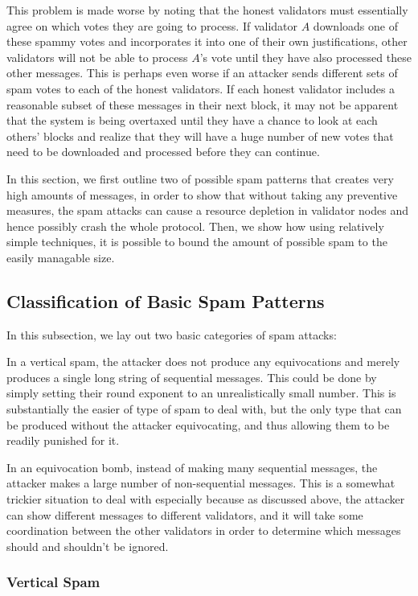 \documentclass[12pt, fleqn]{article}
\begin{document}
This problem is made worse by noting that the honest validators must essentially agree on which votes they are going to process. If validator $A$ downloads one of these spammy votes and incorporates it into one of their own justifications, other validators will not be able to process $A$'s vote until they have also processed these other messages. This is perhaps even worse if an attacker sends different sets of spam votes to each of the honest validators. If each honest validator includes a reasonable subset of these messages in their next block, it may not be apparent that the system is being overtaxed until they have a chance to look at each others' blocks and realize that they will have a huge number of new votes that need to be downloaded and processed before they can continue.

In this section, we first outline two of possible spam patterns that creates very high amounts of messages, in order to show that without taking any preventive measures, the spam attacks can cause a resource depletion in validator nodes and hence possibly crash the whole protocol. Then, we show how using relatively simple techniques, it is possible to bound the amount of possible spam to the easily managable size. 

\subsection{Classification of Basic Spam Patterns}

In this subsection, we lay out two basic categories of spam attacks:

In a vertical spam, the attacker does not produce any equivocations and merely produces a single long string of sequential messages. This could be done by simply setting their round exponent to an unrealistically small number. This is substantially the easier of type of spam to deal with, but the only type that can be produced without the attacker equivocating, and thus allowing them to be readily punished for it.

In an equivocation bomb, instead of making many sequential messages, the attacker makes a large number of non-sequential messages. This is a somewhat trickier situation to deal with especially because as discussed above, the attacker can show different messages to different validators, and it will take some coordination between the other validators in order to determine which messages should and shouldn't be ignored.


\subsubsection{Vertical Spam}
\end{document}
